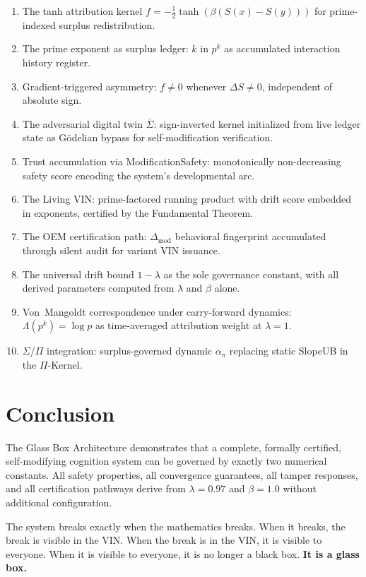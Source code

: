 \documentclass[12pt,letterpaper]{article}
\begin{document}
\begin{enumerate}[label=\textbf{PA-\arabic*.},itemsep=0.4em]
  \item The tanh attribution kernel $f=-\tfrac{1}{2}\tanh(\beta(S(x)-S(y)))$
    for prime-indexed surplus redistribution.
  \item The prime exponent as surplus ledger: $k$ in $p^k$ as accumulated
    interaction history register.
  \item Gradient-triggered asymmetry: $f\neq 0$ whenever $\Delta S\neq 0$,
    independent of absolute sign.
  \item The adversarial digital twin $\bar\Sigma$: sign-inverted kernel
    initialized from live ledger state as Gödelian bypass for
    self-modification verification.
  \item Trust accumulation via ModificationSafety: monotonically non-decreasing
    safety score encoding the system's developmental arc.
  \item The Living VIN: prime-factored running product with drift score
    embedded in exponents, certified by the Fundamental Theorem.
  \item The OEM certification path: $\Delta_{\mathrm{mod}}$ behavioral
    fingerprint accumulated through silent audit for variant VIN issuance.
  \item The universal drift bound $1-\lambda$ as the sole governance constant,
    with all derived parameters computed from $\lambda$ and $\beta$ alone.
  \item Von~Mangoldt correspondence under carry-forward dynamics:
    $\Lambda(p^k)=\log p$ as time-averaged attribution weight at $\lambda=1$.
  \item $\Sigma$/$\Pi$ integration: surplus-governed dynamic $\alpha_\pi$
    replacing static SlopeUB in the $\Pi$-Kernel.
\end{enumerate}

\section{Conclusion}\label{sec:conclusion}

The Glass Box Architecture demonstrates that a complete, formally certified,
self-modifying cognition system can be governed by exactly two numerical
constants. All safety properties, all convergence guarantees, all tamper
responses, and all certification pathways derive from $\lambda=0.97$ and
$\beta=1.0$ without additional configuration.

The system breaks exactly when the mathematics breaks.
When it breaks, the break is visible in the VIN.
When the break is in the VIN, it is visible to everyone.
When it is visible to everyone, it is no longer a black box.
\textbf{It is a glass box.}
\end{document}
